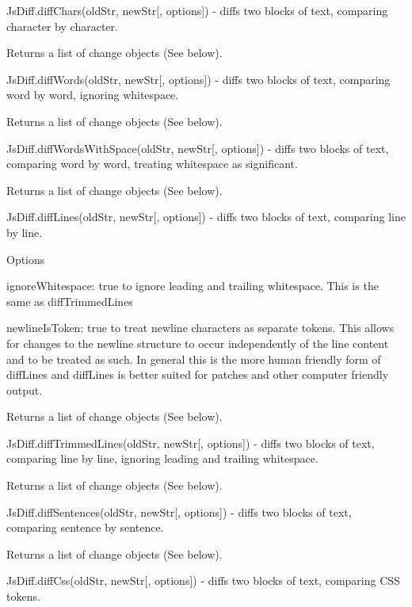 \begin{DoxyItemize}
\item {\ttfamily Js\+Diff.\+diff\+Chars(old\+Str, new\+Str\mbox{[}, options\mbox{]})} -\/ diffs two blocks of text, comparing character by character.

Returns a list of change objects (See below).
\item {\ttfamily Js\+Diff.\+diff\+Words(old\+Str, new\+Str\mbox{[}, options\mbox{]})} -\/ diffs two blocks of text, comparing word by word, ignoring whitespace.

Returns a list of change objects (See below).
\item {\ttfamily Js\+Diff.\+diff\+Words\+With\+Space(old\+Str, new\+Str\mbox{[}, options\mbox{]})} -\/ diffs two blocks of text, comparing word by word, treating whitespace as significant.

Returns a list of change objects (See below).
\item {\ttfamily Js\+Diff.\+diff\+Lines(old\+Str, new\+Str\mbox{[}, options\mbox{]})} -\/ diffs two blocks of text, comparing line by line.

Options
\begin{DoxyItemize}
\item {\ttfamily ignore\+Whitespace}\+: {\ttfamily true} to ignore leading and trailing whitespace. This is the same as {\ttfamily diff\+Trimmed\+Lines}
\item {\ttfamily newline\+Is\+Token}\+: {\ttfamily true} to treat newline characters as separate tokens. This allows for changes to the newline structure to occur independently of the line content and to be treated as such. In general this is the more human friendly form of {\ttfamily diff\+Lines} and {\ttfamily diff\+Lines} is better suited for patches and other computer friendly output.
\end{DoxyItemize}

Returns a list of change objects (See below).
\item {\ttfamily Js\+Diff.\+diff\+Trimmed\+Lines(old\+Str, new\+Str\mbox{[}, options\mbox{]})} -\/ diffs two blocks of text, comparing line by line, ignoring leading and trailing whitespace.

Returns a list of change objects (See below).
\item {\ttfamily Js\+Diff.\+diff\+Sentences(old\+Str, new\+Str\mbox{[}, options\mbox{]})} -\/ diffs two blocks of text, comparing sentence by sentence.

Returns a list of change objects (See below).
\item {\ttfamily Js\+Diff.\+diff\+Css(old\+Str, new\+Str\mbox{[}, options\mbox{]})} -\/ diffs two blocks of text, comparing C\+SS tokens.


\end{DoxyItemize}
